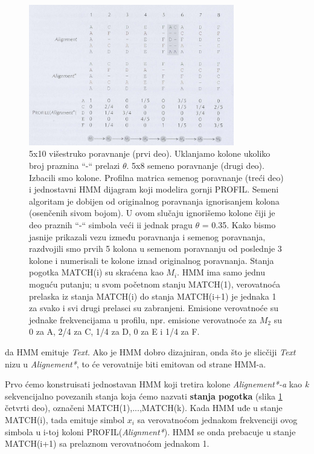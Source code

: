 \begin{figure}[H]
\centering
\includegraphics[width=0.8\textwidth]{poglavlja/10/slike/slika1.png}
\caption{5x10 višestruko poravnanje (prvi deo). Uklanjamo kolone ukoliko broj praznina ``-`` prelazi $\theta$. 5x8 semeno poravnanje (drugi deo). Izbacili smo kolone. Profilna matrica semenog poravnanje (treći deo) i jednostavni HMM dijagram koji modelira gornji PROFIL. Semeni algoritam je dobijen od originalnog poravnanja ignorisanjem kolona (osenčenih sivom bojom). U ovom slučaju ignorišemo kolone čiji je deo praznih ``-`` simbola veći ii jednak pragu $\theta$ = 0.35. Kako bismo jasnije prikazali vezu između poravnanja i semenog poravnanja, razdvojili smo prvih 5 kolona u semenom poravnanju od poslednje 3 kolone i numerisali te kolone iznad originalnog poravnanja. Stanja pogotka MATCH(i) su skraćena kao $M_i$. HMM ima samo jednu moguću putanju; u svom početnom stanju MATCH(1), verovatnoća prelaska iz stanja MATCH(i) do stanja MATCH(i+1) je jednaka 1 za svako i svi drugi prelasci su zabranjeni. Emisione verovatnoće su jednake frekvencijama u profilu, npr. emisione verovatnoće za $M_2$ su 0 za A, 2/4 za C, 1/4 za D, 0 za E i 1/4 za F.}
\label{slika: 1}
\end{figure}

da HMM emituje \textit{Text}. Ako je HMM dobro dizajniran, onda što je slicčiji \textit{Text} nizu u \textit{Alignement*}, to će verovatnije biti emitovan od strane HMM-a.

Prvo ćemo konstruisati jednostavan HMM koji tretira kolone \textit{Alignement*-a} kao \textit{k} sekvencijalno povezanih stanja koja ćemo nazvati \textbf{stanja pogotka} (slika \ref{slika: 1} četvrti deo), označeni MATCH(1),...,MATCH(k). Kada HMM uđe u stanje MATCH(i), tada emituje simbol $x_i$ sa verovatnoćom jednakom frekvenciji ovog simbola u i-toj koloni PROFIL(\textit{Alignment*}). HMM se onda prebacuje u stanje MATCH(i+1) sa prelaznom verovatnoćom jednakom 1.

